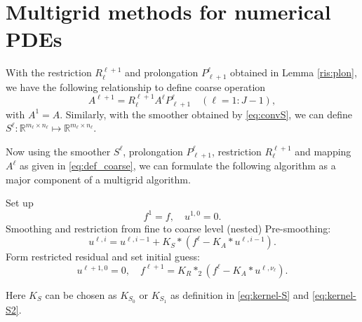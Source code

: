 \section{Multigrid methods for numerical PDEs}\label{sec:mg}


With the restriction $R_{\ell}^{\ell+1}$ and prolongation $P_{\ell+1}^\ell$
obtained in Lemma \ref{ris:plon},
we have the following relationship to define coarse operation
\begin{equation}\label{eq:def_coarse}
A^{\ell+1}=R_{\ell}^{\ell+1} A^{\ell}P_{\ell+1}^{\ell} \quad (\ell = 1:J-1),
\end{equation}
with $A^1 = A$. 
Similarly, with the smoother obtained by \eqref{eq:convS}, we can define 
$S^{\ell}: \mathbb{R}^{m_\ell \times n_\ell} \mapsto \mathbb{R}^{m_\ell \times n_\ell}$.

Now using the smoother $S^\ell$, prolongation $P^{\ell}_{\ell+1}$, restriction $R_{\ell}^{\ell+1}$ and mapping
$A^\ell$ as given in \eqref{eq:def_coarse}, we can formulate the following algorithm
 as a major component of a multigrid algorithm.
\begin{breakablealgorithm}%
	\caption{$(u^{\ell,\nu_\ell}: ~\ell = 1:J) = {\text{MG0}}(f; J,\nu_1, \cdots, \nu_J)$}
	\label{alg:L-Slash0}
	\begin{algorithmic}
		\State Set up
		$$
		f^1 = f, \quad u^{1,0}=0.
		$$
		\State Smoothing and restriction from fine to coarse level (nested)
		\State Pre-smoothing:
		\State
		\begin{equation}\label{eq:smoothing}
		u^{\ell,i} = u^{\ell,i-1} + K_S \ast (f^\ell - K_A \ast u^{\ell,i-1}).
		\end{equation}
		\EndFor
		\State Form restricted residual and set initial guess:
		$$
		u^{\ell+1,0} = 0, \quad f^{\ell+1} = K_R \ast_2 (f^\ell -  K_A \ast u^{\ell,\nu_\ell}).
		$$
		\EndFor
	\end{algorithmic}
\end{breakablealgorithm}
Here $K_S$ can be chosen as $K_{S_0}$ or $K_{S_1}$ as definition in \eqref{eq:kernel-S} and \eqref{eq:kernel-S2}.

